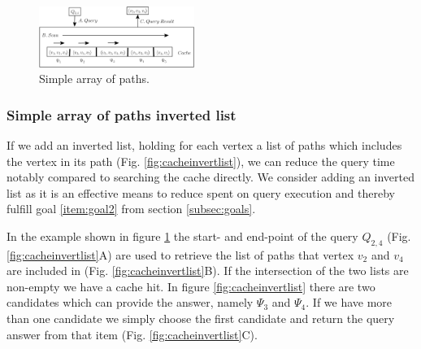 \begin{figure}[hbt]
  \center
        \includegraphics[width=0.45\textwidth]{figures/cachearray.pdf}
        \caption{Simple array of paths.}
  \label{fig:cachearray}
\end{figure}


\subsubsection{Simple array of paths inverted list}

If we add an inverted list, holding for each vertex a list of paths which includes the vertex in its path (Fig. \ref{fig:cacheinvertlist}), we can reduce the query time notably compared to searching the cache directly. We consider adding an inverted list as it is an effective means to reduce \cet spent on query execution and thereby fulfill goal \ref{item:goal2} from section \ref{subsec:goals}.

In the example shown in figure \ref{fig:cachearray} the start- and end-point of the query $Q_{2,4}$ (Fig. \ref{fig:cacheinvertlist}A) are used to retrieve the list of paths that vertex $v_2$ and $v_4$ are included in (Fig. \ref{fig:cacheinvertlist}B). If the intersection of the two lists are non-empty we have a cache hit. In figure \ref{fig:cacheinvertlist} there are two candidates which can provide the answer, namely $\Psi_3$ and $\Psi_4$. If we have more than one candidate we simply choose the first candidate and return the query answer from that item (Fig. \ref{fig:cacheinvertlist}C).

% 

